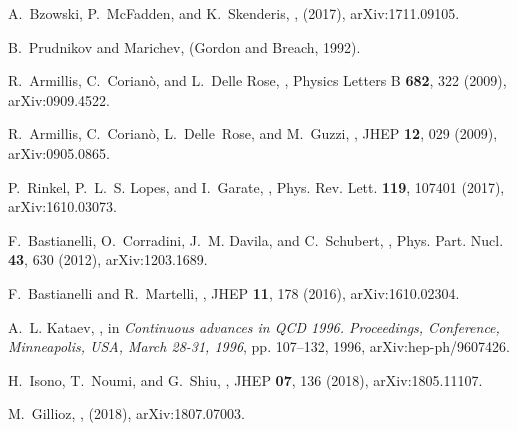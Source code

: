 \documentclass[a4paper,11pt,openright,twoside]{book}
\numberwithin{equation}{section}
\begin{document}
{{\begin{thebibliography}{100}
	A.~Bzowski, P.~McFadden, and K.~Skenderis,
	,
	\newblock (2017), arXiv:1711.09105.
	
	B.~Prudnikov and Marichev,
	 (Gordon and Breach, 1992).
	
	R.~{Armillis}, C.~{Corian{\`o}}, and L.~{Delle Rose},
	,
	\newblock Physics Letters B {\bf 682}, 322 (2009), arXiv:0909.4522.
	
	R.~Armillis, C.~Corian\`o, L.~Delle~Rose, and M.~Guzzi,
	,
	\newblock JHEP {\bf 12}, 029 (2009), arXiv:0905.0865.
	
	P.~Rinkel, P.~L.~S. Lopes, and I.~Garate,
	,
	\newblock Phys. Rev. Lett. {\bf 119}, 107401 (2017), arXiv:1610.03073.
	
	F.~Bastianelli, O.~Corradini, J.~M. Davila, and C.~Schubert,
	,
	\newblock Phys. Part. Nucl. {\bf 43}, 630 (2012), arXiv:1203.1689.
	
	F.~Bastianelli and R.~Martelli,
	,
	\newblock JHEP {\bf 11}, 178 (2016), arXiv:1610.02304.
	
	A.~L. Kataev,
	,
	\newblock in {\em {Continuous advances in QCD 1996. Proceedings, Conference,
			Minneapolis, USA, March 28-31, 1996}}, pp. 107--132, 1996,
	arXiv:hep-ph/9607426.
	
	H.~Isono, T.~Noumi, and G.~Shiu,
	,
	\newblock JHEP {\bf 07}, 136 (2018), arXiv:1805.11107.
	
	M.~Gillioz,
	,
	\newblock (2018), arXiv:1807.07003.
	

\end{thebibliography}}}
\end{document}
